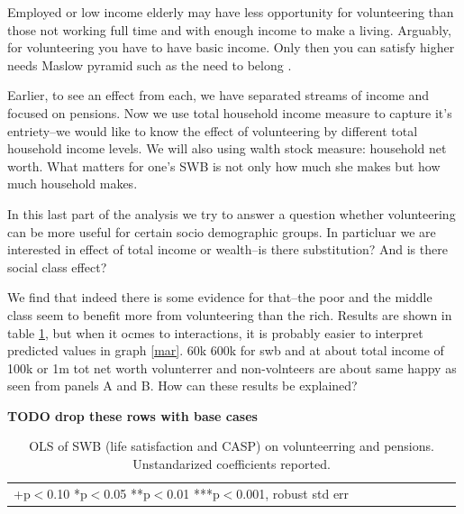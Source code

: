 \documentclass[10pt, letterpaper]{article}
\begin{document}
\begin{spacing}{1.4}
 Employed or low income elderly may have less opportunity for
 volunteering than those not working full time and with enough income to make a
 living. %
%
Arguably, for volunteering you have to have basic income. Only then you can
satisfy  higher needs  Maslow pyramid  such as the need to belong \citep{maslow87}.

Earlier,  to see an effect from each, we have separated streams of income and focused on pensions. 
Now we use total household income measure to capture it's entriety--we would
like to know the effect of volunteering by different total household income
levels. We will  also using walth stock measure: household net worth.
%
What matters for one's SWB is not only how much she makes but how much household makes.

In this last part of the analysis we try to answer a question whether
volunteering can be more useful for certain socio demographic groups. In
particluar we are interested in effect of total income or wealth--is there
substitution? And is there social class effect?

We find that indeed there is some evidence for that--the poor and the middle
class seem to benefit more from volunteering than the rich. Results are shown in
table \ref{regDw6}, but when it ocmes to interactions, it is probably easier to
interpret predicted values in graph \ref{mar}.
%
60k 600k for swb and 
at about total income of 100k or 1m tot net worth volunterrer and non-volnteers
are about same happy as seen from panels A and B.
% 
How can these results be explained?

\textbf{TODO drop these rows with base cases}
\begin{spacing}{.9}
\begin{table}[H]\centering \caption{OLS of SWB  (life satisfaction and CASP) on
    volunteerring and pensions.  Unstandarized coefficients reported.}  \begin{scriptsize} \begin{tabular}{p{1.8in}p{.5in}p{.5in}p{.5in}p{.5in}|p{.5in}p{.5in}p{.5in}p{.5in}p{.5in}p{.4in}p{.5in}p{.4in}}\hline 
      \hline\multicolumn{5}{l}{+p$<$0.10 *p$<$0.05 **p$<$0.01 ***p$<$0.001,
        robust std err} \end{tabular}\label{regDw6} \end{scriptsize}\end{table}
\end{spacing}



\end{spacing}
\end{document}

